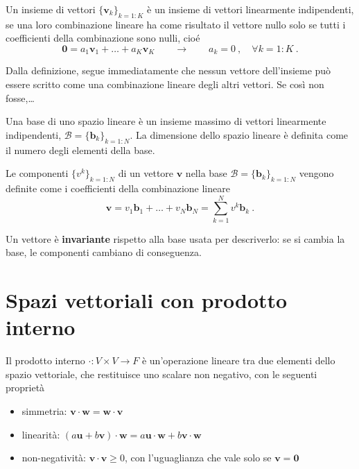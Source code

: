 \begin{definition} Un insieme di vettori $\{ \mathbf{v}_k \}_{k = 1:K}$ è un insieme di vettori linearmente indipendenti, se una loro combinazione lineare ha come risultato il vettore nullo solo se tutti i coefficienti della combinazione sono nulli, cioé
    \begin{equation}
        \mathbf{0} = a_1 \mathbf{v}_1 + \dots + a_K \mathbf{v}_K \qquad \rightarrow \qquad a_k = 0 \ , \quad \forall k = 1:K \ . 
    \end{equation}
\end{definition}
Dalla definizione, segue immediatamente che nessun vettore dell'insieme può essere scritto come una combinazione lineare degli altri vettori. {\color{red} Se così non fosse,\dots}

\begin{definition} Una base di uno spazio lineare è un insieme massimo di vettori linearmente indipendenti, $\mathcal{B} = \{ \mathbf{b}_k \}_{k=1:N}$. La dimensione dello spazio lineare è definita come il numero degli elementi della base.
\end{definition}

\begin{definition} Le componenti $\{ v^k \}_{k = 1:N}$ di un vettore $\mathbf{v}$ nella base $\mathcal{B} = \{ \mathbf{b}_k \}_{k=1:N}$ vengono definite come i coefficienti della combinazione lineare
    \begin{equation}
        \mathbf{v} = v_1 \mathbf{b}_1 + \dots + v_N \mathbf{b}_N = \sum_{k=1}^N v^k \mathbf{b}_k \ .
    \end{equation}
\end{definition}

{\color{red} Un vettore è \textbf{invariante} rispetto alla base usata per descriverlo: se si cambia la base, le componenti cambiano di conseguenza.}

\section{Spazi vettoriali con prodotto interno}
\begin{definition} Il prodotto interno $\cdot: V \times V \rightarrow F$ è un'operazione lineare tra due elementi dello spazio vettoriale, che restituisce uno scalare non negativo, con le seguenti proprietà
    \begin{itemize}
        \item simmetria: $\mathbf{v} \cdot \mathbf{w} = \mathbf{w} \cdot \mathbf{v}$ 
        \item linearità: $( a \mathbf{u} + b \mathbf{v} ) \cdot \mathbf{w} = a \mathbf{u} \cdot \mathbf{w} + b \mathbf{v} \cdot \mathbf{w}$
        \item non-negatività: $\mathbf{v} \cdot \mathbf{v} \ge 0$, con l'uguaglianza che vale solo se $\mathbf{v} = \mathbf{0}$
    \end{itemize}
\end{definition}

